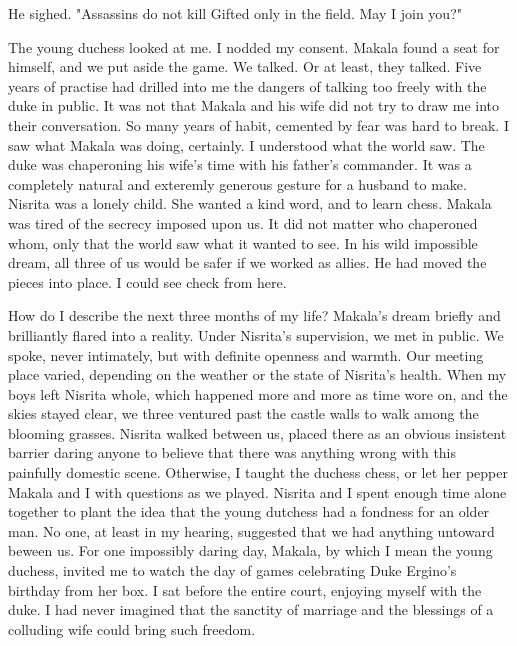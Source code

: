 \documentclass{article}
\begin{document}
He sighed. "Assassins do not kill Gifted only in the field. May I join you?"

The young duchess looked at me. I nodded my consent. Makala found a seat for himself, and we put aside the game. We talked. Or at least, they talked. Five years of practise had drilled into me the dangers of talking too freely with the duke in public. It was not that Makala and his wife did not try to draw me into their conversation. So many years of habit, cemented by fear was hard to break. I saw what Makala was doing, certainly. I understood what the world saw. The duke was chaperoning his wife's time with his father's commander. It was a completely natural and exteremly generous gesture for a husband to make. Nisrita was a lonely child. She wanted a kind word, and to learn chess. Makala was tired of the secrecy imposed upon us. It did not matter who chaperoned whom, only that the world saw what it wanted to see. In his wild impossible dream, all three of us would be safer if we worked as allies. He had moved the pieces into place. I could see check from here.

How do I describe the next three months of my life? Makala's dream briefly and brilliantly flared into a reality. Under Nisrita's supervision, we met in public. We spoke, never intimately, but with definite openness and warmth. Our meeting place varied, depending on the weather or the state of Nisrita's health. When my boys left Nisrita whole, which happened more and more as time wore on, and the skies stayed clear, we three ventured past the castle walls to walk among the blooming grasses. Nisrita walked between us, placed there as an obvious insistent barrier daring anyone to believe that there was anything wrong with this painfully domestic scene. Otherwise, I taught the duchess chess, or let her pepper Makala and I with questions as we played. Nisrita and I spent enough time alone together to plant the idea that the young dutchess had a fondness for an older man. No one, at least in my hearing, suggested that we had anything untoward beween us. For one impossibly daring day, Makala, by which I mean the young duchess, invited me to watch the day of games celebrating Duke Ergino's birthday from her box. I sat before the entire court, enjoying myself with the duke. I had never imagined that the sanctity of marriage and the blessings of a colluding wife could bring such freedom.
\end{document}
